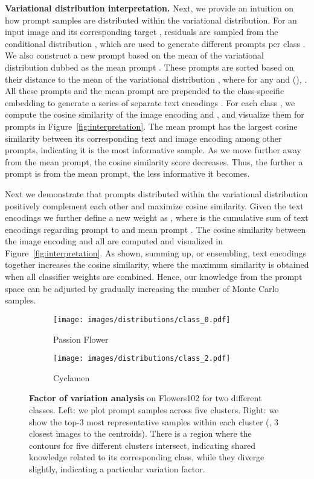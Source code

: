 \documentclass[10pt,twocolumn,letterpaper]{article}
\begin{document}
\textbf{Variational distribution interpretation.} Next, we provide an intuition on how prompt samples are distributed within the variational distribution. For an input image  and its corresponding target ,  residuals are sampled from the conditional distribution , which are used to generate  different prompts per class . We also construct a new prompt based on the mean of the variational distribution  dubbed as the mean prompt . These  prompts are sorted based on their distance to the mean of the variational distribution , where for any  and  (), . All these  prompts and the mean prompt are prepended to the class-specific embedding to generate a series of  separate text encodings . For each class , we compute the cosine similarity of the image encoding  and , and visualize them for  prompts in Figure~\ref{fig:interpretation}. The mean prompt  has the largest cosine similarity between its corresponding text and image encoding among other prompts, indicating it is the most informative sample. As we move further away from the mean prompt, the cosine similarity score decreases. Thus, the further a prompt is from the mean prompt, the less informative it becomes. 

Next we demonstrate that prompts distributed within the variational distribution positively complement each other and maximize cosine similarity. Given the text encodings  we further define a new weight as , where  is the cumulative sum of text encodings regarding prompt  to  and mean prompt . The cosine similarity between the image encoding  and all  are computed and visualized in Figure~\ref{fig:interpretation}. 
As shown, summing up, or ensembling, text encodings together increases the cosine similarity, where the maximum similarity is obtained when all classifier weights are combined. Hence, our knowledge from the prompt space can be adjusted by gradually increasing the number of Monte Carlo samples.


\begin{figure}[ht]
\centering
\vspace{-2mm}
\begin{subfigure}{1\linewidth}
  \centering
  \texttt{[image: images/distributions/class\_0.pdf]}
  \caption{Passion Flower}
\end{subfigure}

\begin{subfigure}{1\linewidth}
  \centering
  \texttt{[image: images/distributions/class\_2.pdf]}
  \caption{Cyclamen}
\end{subfigure}

\caption{\textbf{Factor of variation analysis} on Flowers102 for two different classes. Left: we plot prompt samples across five clusters. Right: we show the top-3 most representative samples within each cluster (\eg, 3 closest images to the centroids). There is a region where the contours for five different clusters intersect, indicating shared knowledge related to its corresponding class, while they diverge slightly, indicating a particular variation factor.}
\label{fig:variation}
\vspace{-5mm}
\end{figure}
\end{document}
